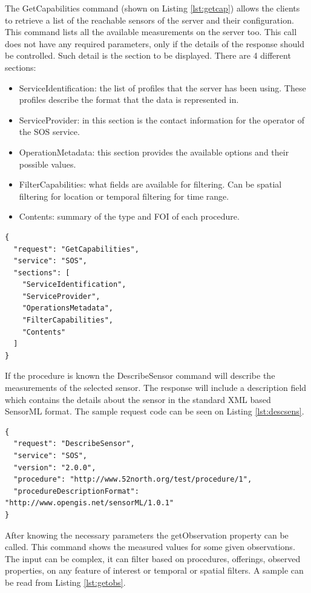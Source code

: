 The GetCapabilities command (shown on Listing \ref{lst:getcap}) allows the clients to retrieve a list of the reachable sensors of the server and their configuration. This command lists all the available measurements on the server too. This call does not have any required parameters, only if the details of the response should be controlled. Such detail is the section to be displayed. There are 4 different sections:
\begin{itemize}
\item ServiceIdentification: the list of profiles that the server has been using. These profiles describe the format that the data is represented in.
\item ServiceProvider: in this section is the contact information for the operator of the SOS service.
\item OperationMetadata: this section provides the available options and their possible values.
\item FilterCapabilities: what fields are available for filtering. Can be spatial filtering for location or temporal filtering for time range.
\item Contents: summary of the type and FOI of each procedure. 
\end{itemize}

\begin{lstlisting}[caption={JSON getCapabilities POST request\label{lst:getcap}}]
{
  "request": "GetCapabilities",
  "service": "SOS",
  "sections": [
    "ServiceIdentification",
    "ServiceProvider",
    "OperationsMetadata",
    "FilterCapabilities",
    "Contents"
  ]
}
\end{lstlisting}

 If the procedure is known the DescribeSensor command will describe the measurements of the selected sensor. The response will include a description field which contains the details about the sensor in the standard XML based SensorML format. The sample request code can be seen on Listing \ref{lst:descsens}.

\begin{lstlisting}[caption={JSON DescribeSensor POST request\label{lst:descsens}}]
{
  "request": "DescribeSensor",
  "service": "SOS",
  "version": "2.0.0",
  "procedure": "http://www.52north.org/test/procedure/1",
  "procedureDescriptionFormat": "http://www.opengis.net/sensorML/1.0.1"
}
\end{lstlisting}

After knowing the necessary parameters the getObservation property can be called. This command shows the measured values for some given observations. The input can be complex, it can filter based on procedures, offerings, observed properties, on any feature of interest or temporal or spatial filters. A sample can be read from Listing \ref{lst:getobs}.

